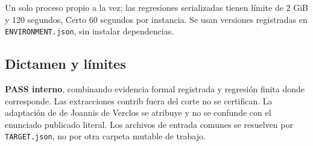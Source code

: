 \documentclass[11pt]{article}
\begin{document}
Un solo proceso propio a la vez; las regresiones serializadas tienen
límite de 2 GiB y 120 segundos, Certo 60 segundos por instancia. Se usan
versiones registradas en \nolinkurl{ENVIRONMENT.json}, sin instalar
dependencias.

\subsection{Dictamen y límites}\label{dictamen-y-luxedmites}

\textbf{PASS interno}, combinando evidencia formal registrada y
regresión finita donde corresponde. Las extracciones contrib fuera del
corte no se certifican. La adaptación de de Joannis de Verclos se
atribuye y no se confunde con el enunciado publicado literal. Los
archivos de entrada comunes se resuelven por \nolinkurl{TARGET.json}, no
por otra carpeta mutable de trabajo.
\end{document}
